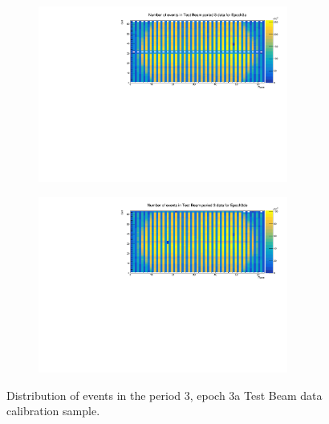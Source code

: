 \documentclass[12pt,a4paper]{article}
\begin{document}
\begin{figure}[!hbtp]
\centering
\begin{subfigure}[b]{\textwidth}
\centering
\includegraphics[width=0.9\textwidth]{Plots/Attenprofs_P3Data_CellPlane_Epoch3a.pdf}
\end{subfigure}
\begin{subfigure}[b]{\textwidth}
\centering
\includegraphics[width=0.9\textwidth]{Plots/Attenprofs_P3Data_CellPlane_Epoch3de.pdf}
\end{subfigure}
\caption{Distribution of events in the period 3, epoch 3a Test Beam data calibration sample.}
\end{figure}
\end{document}
